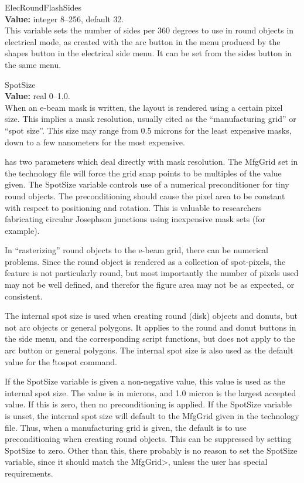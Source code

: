 \begin{description}
\item{\et ElecRoundFlashSides}\\
{\bf Value:} integer 8--256, default 32.\\
This variable sets the number of sides per 360 degrees to use in round
objects in electrical mode, as created with the {\cb arc} button in
the menu produced by the {\cb shapes} button in the electrical side
menu.  It can be set from the {\cb sides} button in the same menu.

\label{spotsize}
\item{\et SpotSize}\\
{\bf Value:} real 0--1.0.\\
When an e-beam mask is written, the layout is rendered using a certain
pixel size.  This implies a mask resolution, usually cited as the
``manufacturing grid'' or ``spot size''.  This size may range from 0.5
microns for the least expensive masks, down to a few nanometers for
the most expensive.

{\Xic} has two parameters which deal directly with mask resolution. 
The {\vt MfgGrid} set in the technology file will force the grid snap
points to be multiples of the value given.  The {\et SpotSize}
variable controls use of a numerical preconditioner for tiny round
objects.  The preconditioning should cause the pixel area to be
constant with respect to positioning and rotation.  This is valuable
to researchers fabricating circular Josephson junctions using
inexpensive mask sets (for example).

In ``rasterizing'' round objects to the e-beam grid, there can be
numerical problems.  Since the round object is rendered as a
collection of spot-pixels, the feature is not particularly round, but
most importantly the number of pixels used may not be well defined,
and therefor the figure area may not be as expected, or consistent.

The internal spot size is used when creating round (disk) objects and
donuts, but not arc objects or general polygons.  It applies to the
{\cb round} and {\cb donut} buttons in the side menu, and the
corresponding script functions, but does not apply to the {\cb arc}
button or general polygons.  The internal spot size is also used as
the default value for the {\cb !tospot} command.

If the {\et SpotSize} variable is given a non-negative value, this
value is used as the internal spot size.  The value is in microns, and
1.0 micron is the largest accepted value.  If this is zero, then no
preconditioning is applied.  If the {\et SpotSize} variable is unset,
the internal spot size will default to the {\vt MfgGrid} given in the
technology file.  Thus, when a manufacturing grid is given, the
default is to use preconditioning when creating round objects.  This
can be suppressed by setting {\et SpotSize} to zero.  Other than this,
there probably is no reason to set the {\et SpotSize} variable, since
it should match the {\vt MfgGrid}>, unless the user has special
requirements.


\end{description}
